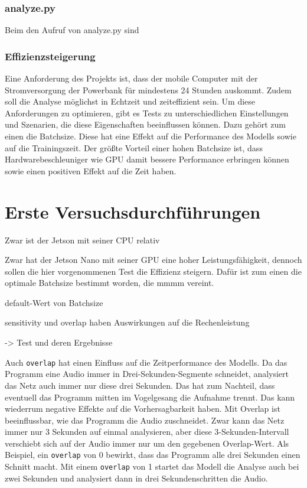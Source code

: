 \subsubsection{analyze.py}
Beim den Aufruf von analyze.py sind %

\subsubsection{Effizienzsteigerung} %
Eine Anforderung des Projekts ist, dass der mobile Computer mit der Stromversorgung der Powerbank für mindestens 24 Stunden auskommt. Zudem soll die Analyse möglichst in Echtzeit und zeiteffizient sein. Um diese Anforderungen zu optimieren, gibt es Tests zu unterschiedlichen Einstellungen und Szenarien, die diese Eigenschaften beeinflussen können. Dazu gehört zum einen die Batchsize. Diese hat eine Effekt auf die Performance des Modells sowie auf die Trainingszeit. Der größte Vorteil einer hohen Batchsize ist, dass Hardwarebeschleuniger wie GPU damit bessere Performance erbringen können sowie einen positiven Effekt auf die Zeit haben.



\section{Erste Versuchsdurchführungen} %



Zwar ist der Jetson mit seiner CPU relativ 


Zwar hat der Jetson Nano mit seiner GPU eine hoher Leistungsfähigkeit, dennoch sollen die hier vorgenommenen Test die Effizienz steigern. Dafür ist zum einen die optimale Batchsize bestimmt worden, die mmmm vereint.

default-Wert von Batchsize

sensitivity und overlap haben Auswirkungen auf die Rechenleistung

-> Test und deren Ergebnisse

Auch \texttt{overlap} hat einen Einfluss auf die Zeitperformance des Modells. 
Da das Programm eine Audio immer in Drei-Sekunden-Segmente schneidet, analysiert das Netz auch immer nur diese drei Sekunden. Das hat zum Nachteil, dass eventuell das Programm mitten im Vogelgesang die Aufnahme trennt. Das kann wiederrum negative Effekte auf die Vorhersagbarkeit haben.
Mit Overlap ist beeinflussbar, wie das Programm die Audio zuschneidet. Zwar kann das Netz immer nur 3 Sekunden auf einmal analysieren, aber diese 3-Sekunden-Intervall verschiebt sich auf der Audio immer nur um den gegebenen Overlap-Wert. 
Als Beispiel, ein \texttt{overlap} von 0 bewirkt, dass das Programm alle drei Sekunden einen Schnitt macht. Mit einem \texttt{overlap} von 1 startet das Modell die Analyse auch bei zwei Sekunden und analysiert dann in drei Sekundenschritten die Audio.

